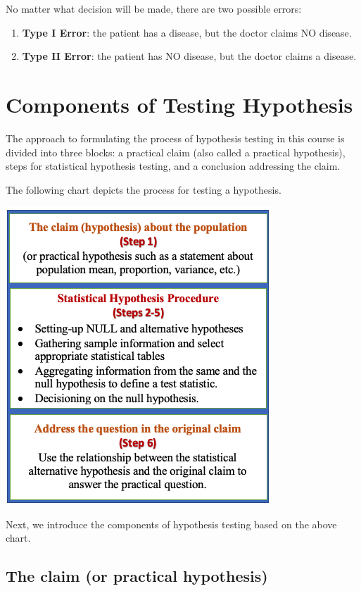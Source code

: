 \documentclass[
]{book}
\begin{document}
No matter what decision will be made, there are two possible errors:

\begin{enumerate}
\def\labelenumi{\arabic{enumi}.}
\item
  \textbf{Type I Error}: the patient has a disease, but the doctor claims NO disease.
\item
  \textbf{Type II Error}: the patient has NO disease, but the doctor claims a disease.
\end{enumerate}

\hfill\break

\hypertarget{components-of-testing-hypothesis}{%
\section{Components of Testing Hypothesis}\label{components-of-testing-hypothesis}}

The approach to formulating the process of hypothesis testing in this course is divided into three blocks: a practical claim (also called a practical hypothesis), steps for statistical hypothesis testing, and a conclusion addressing the claim.

The following chart depicts the process for testing a hypothesis.

\begin{center}\includegraphics[width=0.45\linewidth]{week08/blocksHT} \end{center}

Next, we introduce the components of hypothesis testing based on the above chart.

\hypertarget{the-claim-or-practical-hypothesis}{%
\subsection{The claim (or practical hypothesis)}\label{the-claim-or-practical-hypothesis}}
\end{document}
